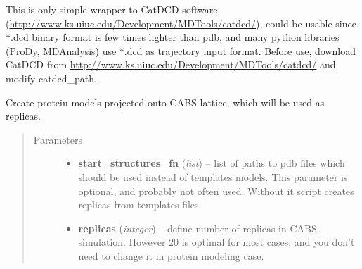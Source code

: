 \documentclass[letterpaper,10pt,english]{sphinxmanual}
\begin{document}
\begin{fulllineitems}
\begin{fulllineitems}
\begin{quote}
\begin{description}
\end{description}\end{quote}

\end{fulllineitems}


\begin{fulllineitems}
\label{api:pycabs.CABS.convertPdbToDcd}
This is only simple wrapper to CatDCD software (\href{http://www.ks.uiuc.edu/Development/MDTools/catdcd/}{http://www.ks.uiuc.edu/Development/MDTools/catdcd/}), 
could be usable since *.dcd binary format is few times lighter than pdb, and many python libraries 
(ProDy, MDAnalysis) use *.dcd as trajectory input format.
Before use, download CatDCD from \href{http://www.ks.uiuc.edu/Development/MDTools/catdcd/}{http://www.ks.uiuc.edu/Development/MDTools/catdcd/} and modify catdcd\_path.

\end{fulllineitems}


\begin{fulllineitems}
\label{api:pycabs.CABS.createLatticeReplicas}
Create protein models projected onto CABS lattice, which will be used as replicas.
\begin{quote}\begin{description}
\item[{Parameters}] \leavevmode\begin{itemize}
\item {} 
\textbf{start\_structures\_fn} (\emph{list}) -- list of paths to pdb files which should be used instead of templates models.  This parameter is optional, and probably not often used. Without it script creates replicas from templates files.

\item {} 
\textbf{replicas} (\emph{integer}) -- define number of replicas in CABS simulation. However 20 is optimal for most cases, and you don't need to change it in protein modeling case.

\end{itemize}

\end{description}\end{quote}


\end{fulllineitems}
\end{fulllineitems}
\end{document}
